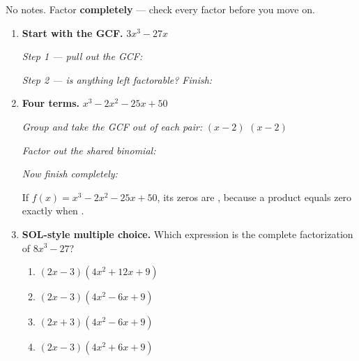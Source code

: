 \documentclass[10pt]{article}
\begin{document}
\namedateperiod

\vspace{0.10in}

No notes. Factor \textbf{completely} --- check every factor before you move on.

\begin{enumerate}[leftmargin=1.8em, itemsep=12pt]
  \item \textbf{Start with the GCF.} $3x^3 - 27x$

    \vspace{3pt}
    \emph{Step 1 --- pull out the GCF:} \blank{5.5cm}

    \vspace{5pt}
    \emph{Step 2 --- is anything left factorable? Finish:} \blank{5.5cm}

  \item \textbf{Four terms.} $x^3 - 2x^2 - 25x + 50$

    \vspace{3pt}
    \emph{Group and take the GCF out of each pair:} \; \blank{2.2cm}$(x-2)$ \; \blank{2.2cm}$(x-2)$

    \vspace{4pt}
    \emph{Factor out the shared binomial:} \blank{5.0cm}

    \vspace{4pt}
    \emph{Now finish completely:} \blank{5.5cm}

    \vspace{4pt}
    If $f(x) = x^3 - 2x^2 - 25x + 50$, its zeros are \blank{4.0cm}, because a product equals zero
    exactly when \blank{4.6cm}.

  \item \textbf{SOL-style multiple choice.} Which expression is the complete factorization of
    $8x^3 - 27$?
    \begin{enumerate}[label=\Alph*., leftmargin=1.9em, itemsep=1pt]
      \item $(2x - 3)(4x^2 + 12x + 9)$
      \item $(2x - 3)(4x^2 - 6x + 9)$
      \item $(2x + 3)(4x^2 - 6x + 9)$
      \item $(2x - 3)(4x^2 + 6x + 9)$
    \end{enumerate}
\end{enumerate}
\end{document}
